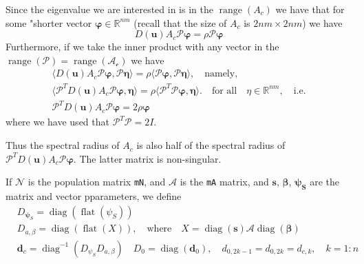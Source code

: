 \documentclass[12pt]{amsart}
\theoremstyle{definition}
\begin{document}
  Since the eigenvalue we are interested in is in the $\operatorname{range}(A_c)$ we have that for some "shorter vector $\bm\varphi\in \mathds{R}^{nm}$ (recall that the size of $A_c$ is $2nm\times 2nm$) we have
  \begin{equation}
    D(\bm u)A_c\mathscr{P} \bm{\varphi} = \rho\mathscr{P}\bm{\varphi} 
    \end{equation}
  Furthermore, if we take the inner product with any vector in the 
$\operatorname{range}(\mathscr{P})=\operatorname{range}(\mathscr{A_c})$ we have
\begin{equation}
  \begin{aligned}
    \langle D(\bm u)A_c\mathscr{P} \bm{\varphi},\mathscr{P}\bm \eta\rangle = 
  \rho\langle \mathscr{P} \bm{\varphi},\mathscr{P}\bm \eta\rangle,\quad\mbox{namely,}\\
  \langle \mathscr{P}^TD(\bm u)A_c\mathscr{P} \bm{\varphi},\bm \eta\rangle = 
  \rho\langle \mathscr{P}^T\mathscr{P} 
  \bm{\varphi},\bm \eta\rangle.\quad\mbox{for all}\quad \eta\in \mathds{R}^{nm},\quad\mbox{i.e.} \\
  \mathscr{P}^TD(\bm u)A_c\mathscr{P} \bm{\varphi}=
  2\rho\bm{\varphi}
  \end{aligned}
  \end{equation}
where we have used that $\mathscr{P}^T\mathscr{P}=2I$.

Thus the spectral radius of $A_c$ is also half of the spectral radius of
 $\mathscr{P}^TD(\bm u)A_c\mathscr{P} \bm{\varphi}$. The latter matrix is non-singular. 



If $\mathscr{N}$ is the population matrix \verb|mN|, and $\mathscr{A}$ is the \verb|mA| matrix, and  
$\bm{s}$, $\bm{\beta}$, $\bm{\psi_S}$ are the matrix and vector pparameters, we define
\begin{equation}
\begin{aligned}
    &D_{\bm\psi_S}=\operatorname{diag}\left(\operatorname{flat}(\psi_S)\right)\\
    &D_{a,\beta}=\operatorname{diag}\left(
      \operatorname{flat}\left(X\right)\right),\quad \mbox{where}\quad 
        X=\operatorname{diag}(\bm s)\mathscr{A} \operatorname{diag}(\bm\beta)\\
    &\bm d_c=\operatorname{diag}^{-1}\left(D_{\psi_S} D_{a,\beta}\right)\quad
    D_0=\operatorname{diag}(\bm d_0), \quad d_{0,2k-1}= d_{0,2k}=d_{c,k}, \quad k=1:n
\end{aligned}
\end{equation}
\end{document}
